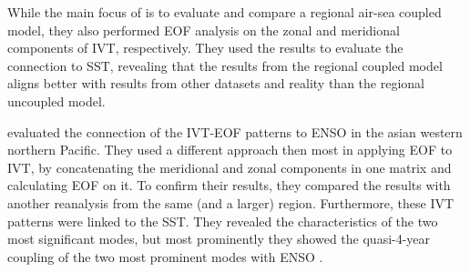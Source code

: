 While the main focus of \cite{yao_simulation_2013} is to evaluate and compare a regional air-sea coupled model, they also performed EOF analysis on the zonal and meridional components of IVT, respectively. 
They used the results to evaluate the connection to SST, revealing that the results from the regional coupled model aligns better with results from other datasets and reality than the regional uncoupled model. 


\citeauthor{li_quasi-4-yr_2012} evaluated the connection of the IVT-EOF patterns to ENSO in the asian western northern Pacific.
They used a different approach then most in applying EOF to IVT, by concatenating the meridional and zonal components in one matrix and calculating EOF on it. 
To confirm their results, they compared the results with another reanalysis from the same (and a larger) region. 
Furthermore, these IVT patterns were linked to the SST. 
They revealed the characteristics of the two most significant modes, but most prominently they showed the quasi-4-year coupling of the two most prominent modes with ENSO \cite{li_quasi-4-yr_2012}. 



